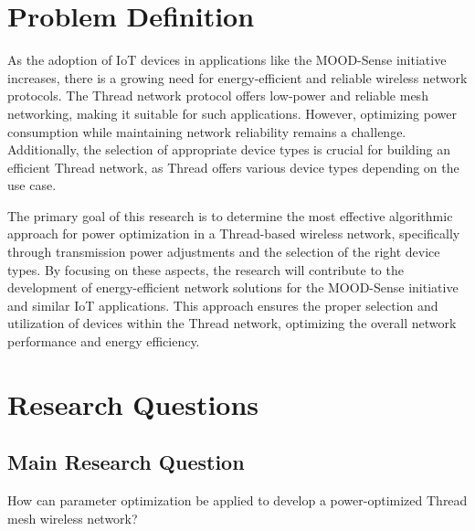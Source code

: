 \section{Problem Definition}\label{sec:problem_definition}
As the adoption of IoT devices in applications like the MOOD-Sense initiative increases, there is a growing need for energy-efficient and reliable wireless network protocols. The Thread network protocol offers low-power and reliable mesh networking, making it suitable for such applications. However, optimizing power consumption while maintaining network reliability remains a challenge. Additionally, the selection of appropriate device types is crucial for building an efficient Thread network, as Thread offers various device types depending on the use case.

The primary goal of this research is to determine the most effective algorithmic approach for power optimization in a Thread-based wireless network, specifically through transmission power adjustments and the selection of the right device types. By focusing on these aspects, the research will contribute to the development of energy-efficient network solutions for the MOOD-Sense initiative and similar IoT applications. This approach ensures the proper selection and utilization of devices within the Thread network, optimizing the overall network performance and energy efficiency.


\section{Research Questions}\label{sec:research_questions}

\subsection*{Main Research Question}
How can parameter optimization be applied to develop a power-optimized Thread mesh wireless network?


